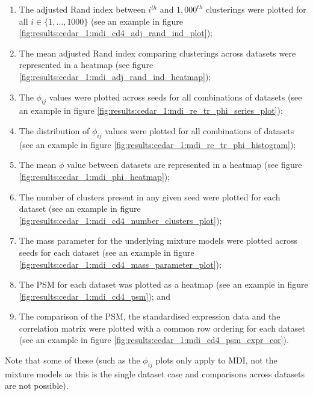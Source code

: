 \documentclass[12pt]{article} %
\begin{document}
	\begin{enumerate}
		\item The adjusted Rand index between $i^{th}$ and $1,000^{th}$ clusterings were plotted for all $i\in \{1,\ldots,1000\}$ (see an example in figure \ref{fig:results:cedar_1:mdi_cd4_adj_rand_ind_plot});
		\item The mean adjusted Rand index comparing clusterings across datasets were represented in a heatmap (see figure \ref{fig:results:cedar_1:mdi_adj_rand_ind_heatmap});
		\item The $\phi_{ij}$ values were plotted across seeds for all combinations of datasets (see an example in  figure \ref{fig:results:cedar_1:mdi_re_tr_phi_series_plot});
		\item The distribution of $\phi_{ij}$ values were plotted for all combinations of datasets (see an example in  figure \ref{fig:results:cedar_1:mdi_re_tr_phi_histogram});
		\item The mean $\phi$ value between datasets are represented in a heatmap (see figure \ref{fig:results:cedar_1:mdi_phi_heatmap});
		\item The number of clusters present in any given seed were plotted for each dataset (see an example in  figure \ref{fig:results:cedar_1:mdi_cd4_number_clusters_plot});
		\item The mass parameter for the underlying mixture models were plotted across seeds for each dataset (see an example in  figure \ref{fig:results:cedar_1:mdi_cd4_mass_parameter_plot});
		\item The PSM for each dataset was plotted as a heatmap (see an example in  figure \ref{fig:results:cedar_1:mdi_cd4_psm}); and
		\item The comparison of the PSM, the standardised expression data and the correlation matrix were plotted with a common row ordering for each dataset (see an example in  figure \ref{fig:results:cedar_1:mdi_cd4_psm_expr_cor}). %
	\end{enumerate}
	Note that some of these (such as the $\phi_{ij}$ plots only apply to MDI, not the mixture models as this is the single dataset case and comparisons across datasets are not possible).

	\newpage
	
\end{document}
